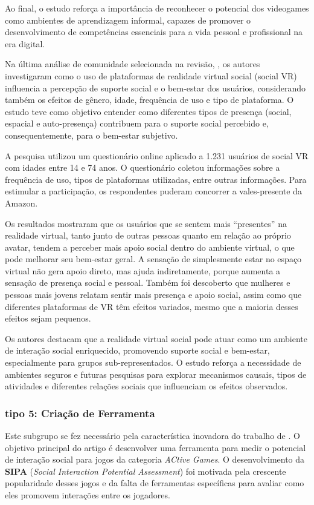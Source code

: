 Ao final, o estudo reforça a importância de reconhecer o potencial dos videogames como ambientes de aprendizagem informal, capazes de promover o desenvolvimento de competências essenciais para a vida pessoal e profissional na era digital.

Na última análise de comunidade selecionada na revisão, \cite{Feelings2023}, os autores investigaram como o uso de plataformas de realidade virtual social (social VR) influencia a percepção de suporte social e o bem-estar dos usuários, considerando também os efeitos de gênero, idade, frequência de uso e tipo de plataforma. O estudo teve como objetivo entender como diferentes tipos de presença (social, espacial e auto-presença) contribuem para o suporte social percebido e, consequentemente, para o bem-estar subjetivo.

A pesquisa utilizou um questionário online aplicado a 1.231 usuários de social VR com idades entre 14 e 74 anos. O questionário coletou informações sobre a frequência de uso, tipos de plataformas utilizadas, entre outras informações. Para estimular a participação, os respondentes puderam concorrer a vales-presente da Amazon.

Os resultados mostraram que os usuários que se sentem mais “presentes” na realidade virtual, tanto junto de outras pessoas quanto em relação ao próprio avatar, tendem a perceber mais apoio social dentro do ambiente virtual, o que pode melhorar seu bem-estar geral. A sensação de simplesmente estar no espaço virtual não gera apoio direto, mas ajuda indiretamente, porque aumenta a sensação de presença social e pessoal. Também foi descoberto que mulheres e pessoas mais jovens relatam sentir mais presença e apoio social, assim como que diferentes plataformas de VR têm efeitos variados, mesmo que a maioria desses efeitos sejam pequenos.

Os autores destacam que a realidade virtual social pode atuar como um ambiente de interação social enriquecido, promovendo suporte social e bem-estar, especialmente para grupos sub-representados. O estudo reforça a necessidade de ambientes seguros e futuras pesquisas para explorar mecanismos causais, tipos de atividades e diferentes relações sociais que influenciam os efeitos observados.

\subsubsection{tipo 5: Criação de Ferramenta}
Este subgrupo se fez necessário pela característica inovadora do trabalho de \cite{Maitland2018}. O objetivo principal do artigo é desenvolver uma ferramenta para medir o potencial de interação social para jogos da categoria \textit{ACtive Games}.
O desenvolvimento da \textbf{SIPA} (\textit{Social Interaction Potential Assessment}) foi motivada pela crescente popularidade desses jogos e da falta de ferramentas específicas para avaliar como eles promovem interações entre os jogadores.

